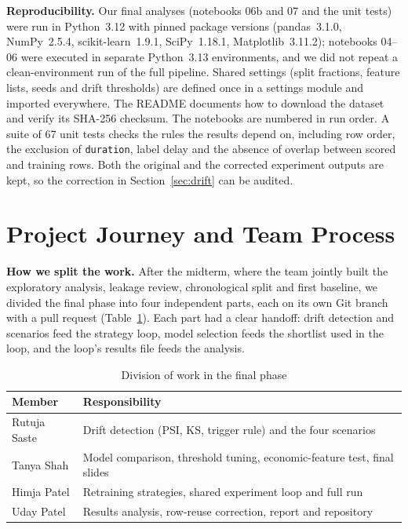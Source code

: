 \documentclass[conference]{IEEEtran}
\begin{document}
\textbf{Reproducibility.} Our final analyses (notebooks 06b and 07 and the unit tests) were run in Python~3.12 with pinned package versions (pandas~3.1.0, NumPy~2.5.4, scikit-learn~1.9.1, SciPy~1.18.1, Matplotlib~3.11.2); notebooks 04--06 were executed in separate Python~3.13 environments, and we did not repeat a clean-environment run of the full pipeline. Shared settings (split fractions, feature lists, seeds and drift thresholds) are defined once in a settings module and imported everywhere. The README documents how to download the dataset and verify its SHA-256 checksum. The notebooks are numbered in run order.
A suite of 67 unit tests checks the rules the results depend on, including row order, the exclusion of \texttt{duration}, label delay and the absence of overlap between scored and training rows. Both the original and the corrected experiment outputs are kept, so the correction in Section~\ref{sec:drift} can be audited.

\section{Project Journey and Team Process}
\label{sec:journey}

\textbf{How we split the work.} After the midterm, where the team jointly built the exploratory analysis, leakage review, chronological split and first baseline, we divided the final phase into four independent parts, each on its own Git branch with a pull request (Table~\ref{tab:team}). Each part had a clear handoff: drift detection and scenarios feed the strategy loop, model selection feeds the shortlist used in the loop, and the loop's results file feeds the analysis.

\begin{table}[t]
\caption{Division of work in the final phase}
\label{tab:team}
\centering
\footnotesize
\begin{tabular}{@{}p{1.9cm}p{5.9cm}@{}}
\toprule
Member & Responsibility \\
\midrule
Rutuja Saste & Drift detection (PSI, KS, trigger rule) and the four scenarios \\
Tanya Shah & Model comparison, threshold tuning, economic-feature test, final slides \\
Himja Patel & Retraining strategies, shared experiment loop and full run \\
Uday Patel & Results analysis, row-reuse correction, report and repository \\
\bottomrule
\end{tabular}
\end{table}
\end{document}
